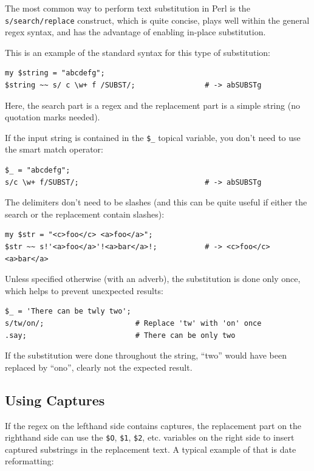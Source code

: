 The most common way to perform text substitution 
in Perl is the \verb's/search/replace' construct, which 
is quite concise, plays well within the general regex syntax, 
and has the advantage of enabling in-place substitution.

This is an example of the standard syntax for this type 
of substitution:

\begin{verbatim}
my $string = "abcdefg";
$string ~~ s/ c \w+ f /SUBST/;                # -> abSUBSTg
\end{verbatim}

Here, the search part is a regex and the replacement 
part is a simple string (no quotation marks needed).

If the input string is contained in the \verb'$_' topical variable,
you don't  need to use the smart match operator:

\begin{verbatim}
$_ = "abcdefg";
s/c \w+ f/SUBST/;                             # -> abSUBSTg
\end{verbatim}
%

The delimiters don't need to be slashes (and this can be quite 
useful if either the search or the replacement contain slashes):

\begin{verbatim}
my $str = "<c>foo</c> <a>foo</a>";
$str ~~ s!'<a>foo</a>'!<a>bar</a>!;           # -> <c>foo</c> <a>bar</a>
\end{verbatim}
%

Unless specified otherwise (with an adverb), the substitution 
is done only once, which helps to prevent unexpected results:

\begin{verbatim}
$_ = 'There can be twly two';
s/tw/on/;                     # Replace 'tw' with 'on' once
.say;                         # There can be only two
\end{verbatim}
%
If the substitution were done throughout the string, ``two'' 
would have been replaced by ``ono'', clearly not the expected 
result.

\subsection{Using Captures}

If the regex on the lefthand side contains captures, the 
replacement part on the righthand side can use the \verb'$O', 
\verb'$1', \verb'$2', etc. variables on the right side to insert 
captured substrings in the replacement text. A typical 
example of that is date reformatting:

